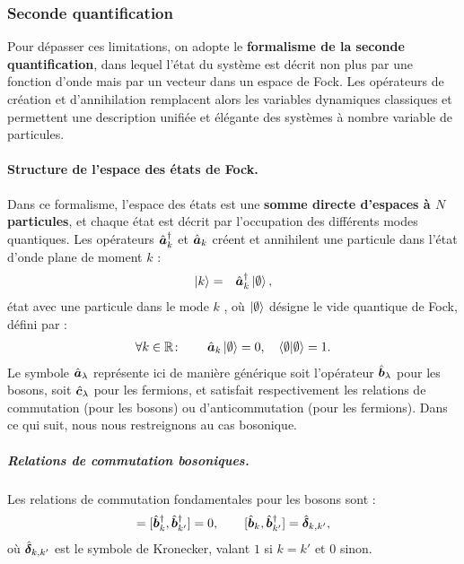 \subsubsection{Seconde quantification}

Pour dépasser ces limitations, on adopte le \textbf{formalisme de la seconde quantification}, dans lequel l’état du système est décrit non plus par une fonction d’onde mais par un vecteur dans un espace de Fock. Les opérateurs de création et d’annihilation remplacent alors les variables dynamiques classiques et permettent une description unifiée et élégante des systèmes à nombre variable de particules.

\paragraph{Structure de l’espace des états de Fock.}
Dans ce formalisme, l’espace des états est une {\bf somme directe d’espaces à $N$ particules}, et chaque état est décrit par l’occupation des différents modes quantiques. Les opérateurs $\hat{\bm{a}}_k^\dagger$ et $\hat{\bm{a}}_k$ créent et annihilent une particule dans l’état d’onde plane de moment $k$ :
\begin{eqnarray}
	\ket{k} & = & \operator{a}_k^\dagger \ket{\emptyset} ,%
\end{eqnarray}
état avec une particule dans le mode $k$ , où \(\ket{\emptyset}\) désigne le vide quantique de Fock, défini par :
\begin{eqnarray}
	\forall k \in \mathbb{R}\colon \qquad \hat{\bm{a}}_k \ket{\emptyset} = 0 ,\quad  \langle \emptyset \vert \emptyset \rangle = 1. \label{chap:eq.vide.fock.k}
\end{eqnarray}
Le symbole \( \hat{\bm{a}}_\lambda \) représente ici de manière générique soit l’opérateur \( \hat{\bm{b}}_\lambda \) pour les bosons, soit \( \hat{\bm{c}}_\lambda \) pour les fermions, et satisfait respectivement les relations de commutation (pour les bosons) ou d’anticommutation (pour les fermions). Dans ce qui suit, nous nous restreignons au cas bosonique.

\subparagraph{Relations de commutation bosoniques.} Les relations de commutation fondamentales pour les bosons sont :
\begin{eqnarray}
	[\operator{b}_k, \operator{b}_{k'}] = [\operator{b}_k^\dagger, \operator{b}_{k'}^\dagger] = 0 ,\qquad [\operator{b}_k, \operator{b}_{k'}^\dagger] = \operator{\delta}_{k,k'}, \label{chap:1:com.1.k}
\end{eqnarray}
où $\hat{\bm{\delta}}_{k,k'}$ est le symbole de Kronecker, valant $1$ si $k = k'$ et $0$ sinon.


